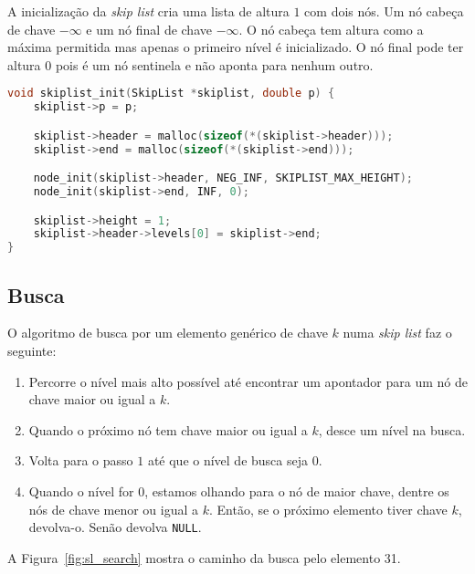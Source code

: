 \documentclass[paper=a4, fontsize=11pt]{scrartcl} %
\numberwithin{equation}{section}
\numberwithin{figure}{section}
\numberwithin{table}{section}
\numberwithin{definition}{section}
\numberwithin{theorem}{section}
\numberwithin{property}{section}
\numberwithin{proposition}{section}
\newcommand{\skl}{\textit{skip list}\xspace}
\renewcommand{\sl}{\textit{skip list}\xspace}
\begin{document}
A inicialização da \sl cria uma lista de altura $1$ com dois nós. Um nó cabeça de chave $-\infty$ e um nó final de
chave $-\infty$. O nó cabeça tem altura como a máxima permitida mas apenas o primeiro nível é inicializado. O nó final pode 
ter altura $0$ pois é um nó sentinela e não aponta para nenhum outro.

\begin{lstlisting}[caption=Inicialização de uma skip list., language=C]
void skiplist_init(SkipList *skiplist, double p) {
    skiplist->p = p;

    skiplist->header = malloc(sizeof(*(skiplist->header)));
    skiplist->end = malloc(sizeof(*(skiplist->end)));

    node_init(skiplist->header, NEG_INF, SKIPLIST_MAX_HEIGHT);
    node_init(skiplist->end, INF, 0);

    skiplist->height = 1;
    skiplist->header->levels[0] = skiplist->end;
}
\end{lstlisting}

\FloatBarrier
\subsection{Busca}

O algoritmo de busca por um elemento genérico de chave $k$ numa \skl faz o seguinte:
\begin{enumerate}
  \item Percorre o nível mais alto possível até encontrar um apontador para um nó de chave maior ou igual
a $k$.
  \item Quando o próximo nó tem chave maior ou igual a $k$, desce um nível na busca.
  \item Volta para o passo $1$ até que o nível de busca seja $0$.
  \item Quando o nível for $0$, estamos olhando para o nó de maior chave, dentre os nós de chave 
  menor ou igual a $k$. Então, se o próximo elemento tiver chave $k$, devolva-o. Senão devolva \verb|NULL|.
\end{enumerate}

A Figura~\ref{fig:sl_search} mostra o caminho da busca pelo elemento 31.
\end{document}
